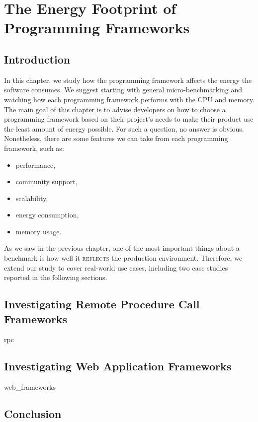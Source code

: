\chapter{The Energy Footprint of Programming Frameworks }
\label{chapter:porgramming_langauges}
\section{Introduction}
In this chapter, we study how the programming framework affects the energy the software consumes.
We suggest starting with general micro-benchmarking and watching how each programming framework performs with the CPU and memory.
The main goal of this chapter is to advise developers on how to choose a programming framework based on their project's needs to make their product use the least amount of energy possible.
For such a question, no answer is obvious.
Nonetheless, there are some features we can take from each programming framework, such as:
\begin{itemize}
    \item performance,
    \item community support,
    \item scalability,
    \item energy consumption,
    \item memory usage.
\end{itemize}

As we saw in the previous chapter, one of the most important things about a benchmark is how well it \textsc{reflects} the production environment.
Therefore, we extend our study to cover real-world use cases, including two case studies reported in the following sections.

\section{Investigating Remote Procedure Call Frameworks}
{rpc}


\section{Investigating Web Application Frameworks}
{web_frameworks}

\section{Conclusion}
